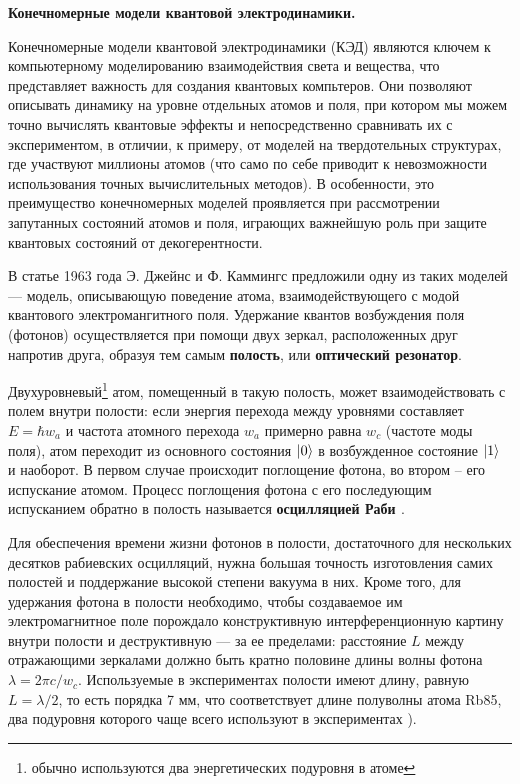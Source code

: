 \clearpage
\indent\textbf{Конечномерные модели квантовой электродинамики.}

Конечномерные модели квантовой электродинамики (КЭД) являются ключем к компьютерному моделированию взаимодействия света и вещества, что представляет важность для создания квантовых компьтеров. Они позволяют описывать динамику на уровне отдельных атомов и поля, при котором мы можем точно вычислять квантовые эффекты и непосредственно сравнивать их с экспериментом, в отличии, к примеру, от моделей на твердотельных структурах, где участвуют миллионы атомов (что само по себе приводит к невозможности использования точных вычислительных методов). В особенности, это преимущество конечномерных моделей проявляется при рассмотрении запутанных состояний атомов и поля, играющих важнейшую роль при защите квантовых состояний от декогерентности.

В статье 1963 года \cite{jc_comparison} Э. Джейнс и Ф. Каммингс предложили одну из таких моделей --- модель, описывающую поведение атома, взаимодействующего с модой квантового электромангитного поля. Удержание квантов возбуждения поля (фотонов) осуществляется при помощи двух зеркал, расположенных друг напротив друга, образуя тем самым \textbf{полость}, или \textbf{оптический резонатор}.

\begin{figure}[h!]
	\noindent{}
\end{figure}

Двухуровневый\footnote{обычно используются два энергетических подуровня в атоме} атом, помещенный в такую полость, может взаимодействовать с полем внутри полости: если энергия перехода между уровнями составляет $E = \hbar w_{a}$ и частота атомного перехода $w_{a}$ примерно равна $w_{c}$ (частоте моды поля), атом переходит из основного состояния $|0\rangle$ в возбужденное состояние $|1\rangle$ и наоборот. В первом случае происходит поглощение фотона, во втором -- его испускание атомом. Процесс поглощения фотона с его последующим испусканием обратно в полость называется \textbf{осцилляцией Раби \cite{rabi_1,rabi_2,rabi_3}}. 

Для обеспечения времени жизни фотонов в полости, достаточного для нескольких десятков рабиевских осцилляций, нужна большая точность изготовления самих полостей и поддержание высокой степени вакуума в них. Кроме того, для удержания фотона в полости необходимо, чтобы создаваемое им электромагнитное поле порождало конструктивную интерференционную картину внутри полости и деструктивную --- за ее пределами: расстояние $L$ между отражающими зеркалами должно быть кратно половине длины волны фотона $\lambda = 2\pi c/w_{c}$. Используемые в экспериментах полости имеют длину, равную $L = \lambda/2$, то есть порядка 7 мм, что соответствует длине полуволны атома Rb85, два подуровня которого чаще всего используют в экспериментах \cite{rempe,rb_1,rb_2,rb_3}).

